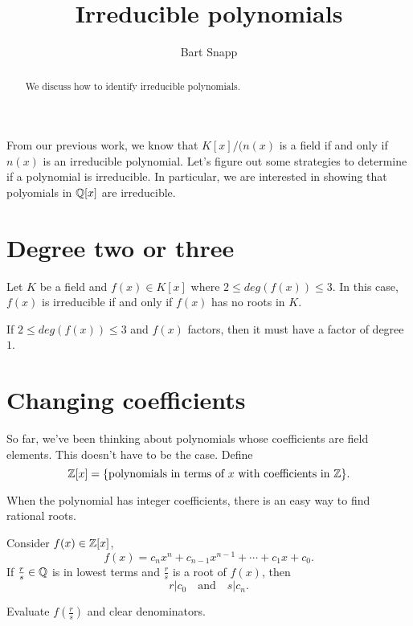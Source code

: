 \documentclass{ximera}
\author{Bart Snapp}
\title{Irreducible polynomials}
\begin{document}
\begin{abstract}
  We discuss how to identify irreducible polynomials.
\end{abstract}
\maketitle

From our previous work, we know that $K[x]/(n(x)$ is a field if and
only if $n(x)$ is an irreducible polynomial. Let's figure out some
strategies to determine if a polynomial is irreducible. In particular,
we are interested in showing that polyomials in $\mathbb Q[x]$ are
irreducible.

\section{Degree two or three}

\begin{lemma}\label{L:d23}
  Let $K$ be a field and $f(x)\in K[x]$ where $2 \le deg(f(x))\le 3$. In
  this case, $f(x)$ is irreducible if and only if $f(x)$ has no roots
  in $K$.
  \begin{sketch}
    If $2 \le deg(f(x))\le 3$ and $f(x)$ factors, then it must have a
    factor of degree $1$.
  \end{sketch}
\end{lemma}






\section{Changing coefficients}

So far, we've been thinking about polynomials whose coefficients are
field elements. This doesn't have to be the case. Define
\[
\mathbb Z[x] = \{\text{polynomials in terms of $x$ with coefficients in
  $\mathbb Z$}\}.
\]

When the polynomial has integer coefficients, there is an easy way to
find rational roots.

\begin{lemma}\label{L:rr}
  Consider $f(x) \in \mathbb Z[x]$,
  \[
  f(x) = c_nx^n + c_{n-1}x^{n-1} + \cdots + c_1 x + c_0.
  \]
  If $\frac{r}{s}\in\mathbb Q$ is in lowest terms and $\frac{r}{s}$ is a root
  of $f(x)$, then
  \[
  r | c_0 \quad\text{and}\quad s | c_n.
  \]
  \begin{sketch}
    Evaluate $f\left(\frac{r}{s}\right)$ and clear denominators.
  \end{sketch}
\end{lemma}
\end{document}
